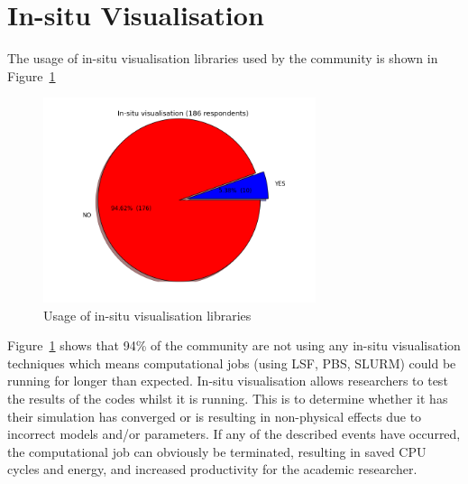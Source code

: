 \documentclass[12pt]{article}
\begin{document}
\section{In-situ Visualisation}\label{isv}
The usage of in-situ visualisation libraries used by the community is shown in 
Figure~\ref{plplot:png}
\begin{figure}[H]
\begin{center}
\includegraphics[width=8cm,height=6cm]{plplot.png}
\caption{Usage of in-situ visualisation libraries}\label{plplot:png}
\end{center}
\end{figure}
Figure~\ref{plplot:png} shows that 94\% of the community are not using any
in-situ visualisation techniques which means computational jobs (using LSF, PBS, SLURM) 
could be running for longer than expected. In-situ visualisation allows researchers to 
test the results of the codes whilst it is running. This is to determine whether it has 
their simulation has converged or is resulting in non-physical effects due to incorrect
models and/or parameters. If any of the described events have occurred, the computational
job can obviously be terminated, resulting in saved CPU cycles and energy, and
increased productivity for the academic researcher. 
%
\end{document}
